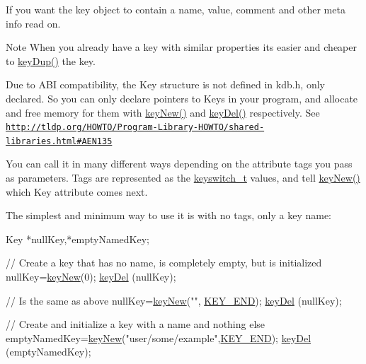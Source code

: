 If you want the key object to contain a name, value, comment and other meta info read on.

\begin{DoxyNote}{Note}
When you already have a key with similar properties its easier and cheaper to \hyperlink{group__key_gae6ec6a60cc4b8c1463fa08623d056ce3}{key\-Dup()} the key.
\end{DoxyNote}
Due to A\-B\-I compatibility, the {\ttfamily Key} structure is not defined in kdb.\-h, only declared. So you can only declare {\ttfamily pointers} to {\ttfamily Keys} in your program, and allocate and free memory for them with \hyperlink{group__key_gaf6893c038b3ebee90c73a9ea8356bebf}{key\-New()} and \hyperlink{group__key_ga3df95bbc2494e3e6703ece5639be5bb1}{key\-Del()} respectively. See \href{http://tldp.org/HOWTO/Program-Library-HOWTO/shared-libraries.html#AEN135}{\tt http\-://tldp.\-org/\-H\-O\-W\-T\-O/\-Program-\/\-Library-\/\-H\-O\-W\-T\-O/shared-\/libraries.\-html\#\-A\-E\-N135}

You can call it in many different ways depending on the attribute tags you pass as parameters. Tags are represented as the \hyperlink{group__key_ga91fb3178848bd682000958089abbaf40}{keyswitch\-\_\-t} values, and tell \hyperlink{group__key_gaf6893c038b3ebee90c73a9ea8356bebf}{key\-New()} which Key attribute comes next.

The simplest and minimum way to use it is with no tags, only a key name\-: 
\begin{DoxyCode}
Key *nullKey,*emptyNamedKey;

\textcolor{comment}{// Create a key that has no name, is completely empty, but is initialized}
nullKey=\hyperlink{group__key_gaf6893c038b3ebee90c73a9ea8356bebf}{keyNew}(0);
\hyperlink{group__key_ga3df95bbc2494e3e6703ece5639be5bb1}{keyDel} (nullKey);

\textcolor{comment}{// Is the same as above}
nullKey=\hyperlink{group__key_gaf6893c038b3ebee90c73a9ea8356bebf}{keyNew}(\textcolor{stringliteral}{""}, \hyperlink{group__key_gga91fb3178848bd682000958089abbaf40aa8adb6fcb92dec58fb19410eacfdd403}{KEY\_END});
\hyperlink{group__key_ga3df95bbc2494e3e6703ece5639be5bb1}{keyDel} (nullKey);

\textcolor{comment}{// Create and initialize a key with a name and nothing else}
emptyNamedKey=\hyperlink{group__key_gaf6893c038b3ebee90c73a9ea8356bebf}{keyNew}(\textcolor{stringliteral}{"user/some/example"},\hyperlink{group__key_gga91fb3178848bd682000958089abbaf40aa8adb6fcb92dec58fb19410eacfdd403}{KEY\_END});
\hyperlink{group__key_ga3df95bbc2494e3e6703ece5639be5bb1}{keyDel} (emptyNamedKey);
\end{DoxyCode}


